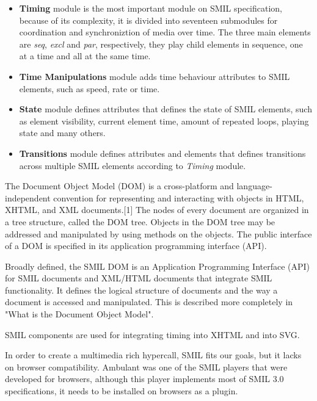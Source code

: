\begin{itemize}
  \item \textbf{Timing} module is the most important module on \ac{SMIL} specification, because of its complexity, it is divided into seventeen submodules for coordination and synchroniztion of media over time. The three main elements are \textit{seq}, \textit{excl} and \textit{par}, respectively, they play child elements in sequence, one at a time and all at the same time. 

  \item \textbf{Time Manipulations} module adds time behaviour attributes to \ac{SMIL} elements, such as speed, rate or time.

  \item \textbf{State} module defines attributes that defines the state of \ac{SMIL} elements, such as element visibility, current element time, amount of repeated loops, playing state and many others.

  \item \textbf{Transitions} module defines attributes and elements that defines transitions across multiple \ac{SMIL} elements according to \textit{Timing} module.

\end{itemize}

{\color{blue} The Document Object Model (DOM) is a cross-platform and language-independent convention for representing and interacting with objects in HTML, XHTML, and XML documents.[1] The nodes of every document are organized in a tree structure, called the DOM tree. Objects in the DOM tree may be addressed and manipulated by using methods on the objects. The public interface of a DOM is specified in its application programming interface (API).}

{\color{blue} Broadly defined, the SMIL DOM is an Application Programming Interface (API) for SMIL documents and XML/HTML documents that integrate SMIL functionality.  It defines the logical structure of documents and the way a document is accessed and manipulated.  This is described more completely in "What is the Document Object Model".}

  \ac{SMIL} components are used for integrating timing into XHTML and into SVG.

  In order to create a multimedia rich hypercall, \ac{SMIL} fits our goals, but it lacks on browser compatibility. Ambulant \cite{ambulant} was one of the SMIL players that were developed for browsers, although this player implements most of \ac{SMIL} 3.0 \cite{smil3} specifications, it needs to be installed on browsers as a plugin.

